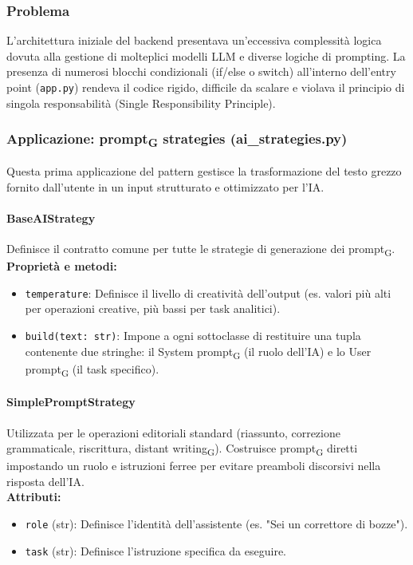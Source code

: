 \documentclass[11pt,a4paper]{article}
\newcommand{\gls}[1]{#1\textsubscript{G}}
\begin{document}
\subsubsection{Problema}
L’architettura iniziale del backend presentava un'eccessiva complessità logica dovuta alla gestione di molteplici modelli LLM e diverse logiche di prompting. La presenza di numerosi blocchi condizionali (if/else o switch) all'interno dell'entry point (\texttt{app.py}) rendeva il codice rigido, difficile da scalare e violava il principio di singola responsabilità (Single Responsibility Principle).

\subsubsection{Applicazione: \gls{prompt} strategies (ai\_strategies.py)}
Questa prima applicazione del pattern gestisce la trasformazione del testo grezzo fornito dall'utente in un input strutturato e ottimizzato per l'IA.

\paragraph{BaseAIStrategy}
Definisce il contratto comune per tutte le strategie di generazione dei \gls{prompt}.
\textbf{Proprietà e metodi:}
\begin{itemize}
    \item \texttt{temperature}: Definisce il livello di creatività dell'output (es. valori più alti per operazioni creative, più bassi per task analitici).
    \item \texttt{build(text: str)}: Impone a ogni sottoclasse di restituire una tupla contenente due stringhe: il \gls{System prompt} (il ruolo dell'IA) e lo \gls{User prompt} (il task specifico).
\end{itemize}

\paragraph{SimplePromptStrategy}
Utilizzata per le operazioni editoriali standard (riassunto, correzione grammaticale, riscrittura, \gls{distant writing}). Costruisce \gls{prompt} diretti impostando un ruolo e istruzioni ferree per evitare preamboli discorsivi nella risposta dell'IA.
\\ \textbf{Attributi:}
\begin{itemize}
    \item \texttt{role} (str): Definisce l'identità dell'assistente (es. "Sei un correttore di bozze").
    \item \texttt{task} (str): Definisce l'istruzione specifica da eseguire.
\end{itemize}
\end{document}
